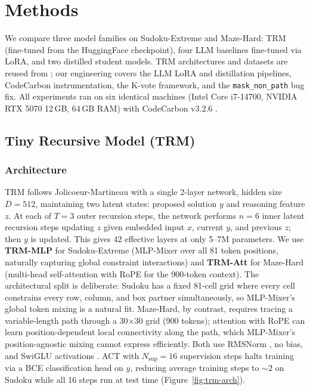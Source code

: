 \documentclass{article}
\begin{document}

\section{Methods}
\label{sec:methods}

We compare three model families on Sudoku-Extreme and Maze-Hard: TRM (fine-tuned from the HuggingFace checkpoint), four LLM baselines fine-tuned via LoRA, and two distilled student models. TRM architectures and datasets are reused from \cite{JolicoeurMartineau2025}; our engineering covers the LLM LoRA and distillation pipelines, CodeCarbon instrumentation, the K-vote framework, and the \texttt{mask\_non\_path} bug fix. All experiments ran on six identical machines (Intel Core i7-14700, NVIDIA RTX 5070 12\,GB, 64\,GB RAM) with CodeCarbon v3.2.6 \cite{Courty2023}.

\subsection{Tiny Recursive Model (TRM)}

\subsubsection{Architecture}

TRM follows Jolicoeur-Martineau  with a single 2-layer network, hidden size $D=512$, maintaining two latent states: proposed solution $y$ and reasoning feature $z$. At each of $T=3$ outer recursion steps, the network performs $n=6$ inner latent recursion steps updating $z$ given embedded input $x$, current $y$, and previous $z$; then $y$ is updated. This gives 42 effective layers at only 5--7M parameters. We use \textbf{TRM-MLP} for Sudoku-Extreme (MLP-Mixer \cite{Tolstikhin2021} over all 81 token positions, naturally capturing global constraint interactions) and \textbf{TRM-Att} for Maze-Hard (multi-head self-attention with RoPE for the 900-token context). The architectural split is deliberate: Sudoku has a fixed 81-cell grid where every cell constrains every row, column, and box partner simultaneously, so MLP-Mixer's global token mixing is a natural fit. Maze-Hard, by contrast, requires tracing a variable-length path through a 30$\times$30 grid (900 tokens); attention with RoPE can learn position-dependent local connectivity along the path, which MLP-Mixer's position-agnostic mixing cannot express efficiently. Both use RMSNorm \cite{Zhang2019}, no bias, and SwiGLU activations \cite{Shazeer2020}. ACT with $N_\text{sup}=16$ supervision steps halts training via a BCE classification head on $y$, reducing average training steps to ${\sim}2$ on Sudoku while all 16 steps run at test time (Figure~\ref{fig:trm-arch}).
\end{document}
